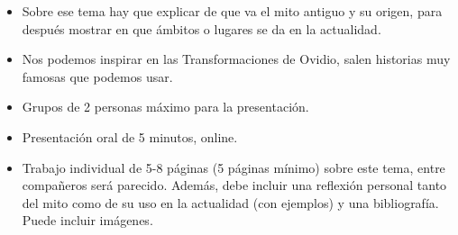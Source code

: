 \begin{enumerate}
\begin{itemize}
		      \item Sobre ese tema hay que explicar de que va el mito antiguo y su origen, para después mostrar en que ámbitos o lugares se da en la actualidad.
		      \item Nos podemos inspirar en las Transformaciones de Ovidio, salen historias muy famosas que podemos usar.
		      \item Grupos de 2 personas máximo para la presentación.
		      \item Presentación oral de 5 minutos, online.
		      \item Trabajo individual de 5-8 páginas (5 páginas mínimo) sobre este tema, entre compañeros será parecido. Además, debe incluir una reflexión personal tanto del mito como de su uso en la actualidad (con ejemplos) y una bibliografía. Puede incluir imágenes.
	      \end{itemize}
\end{enumerate}